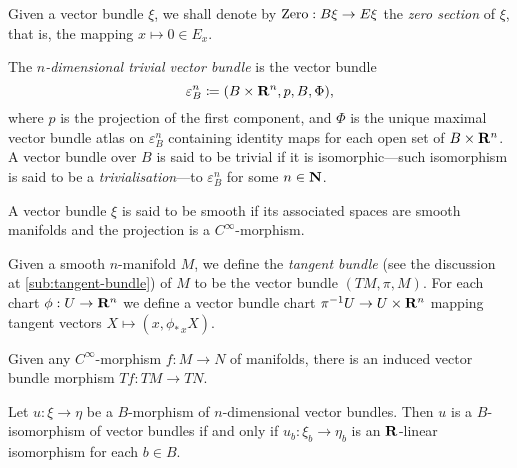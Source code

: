 \documentclass[../../../deep-dive]{subfile}
\begin{document}
\begin{definition}
\label{def:zero-section}
Given a vector bundle \(\xi\), we shall denote by \(\operatorname{Zero}: B \xi \to E \xi\)
the \emph{zero section} of \(\xi\), that is, the mapping \(x \mapsto 0 \in E_x\).
\end{definition}

\begin{definition}
\label{def:trivial-vector-bundle}
The \emph{\(n\)-dimensional trivial vector bundle} is the vector bundle
\[
\varepsilon_B^n \coloneq (B \times \mathbf{R}^n, p, B, \Phi),
\]
where \(p\) is the projection of the first component, and \(\Phi\) is the unique
maximal vector bundle atlas on \(\varepsilon_B^n\) containing identity maps for
each open set of \(B \times \mathbf{R}^n\). A vector bundle over \(B\) is said to be
trivial if it is isomorphic---such isomorphism is said to be a
\emph{trivialisation}---to \(\varepsilon_B^n\) for some \(n \in \mathbf{N}\).
\end{definition}

\begin{definition}
\label{def:smooth-bundles}
A vector bundle \(\xi\) is said to be smooth if its associated spaces are smooth
manifolds and the projection is a \(C^{\infty}\)-morphism.
\end{definition}

\begin{example}
\label{exp:tangent-bundle}
Given a smooth \(n\)-manifold \(M\), we define the \emph{tangent bundle} (see
the discussion at \cref{sub:tangent-bundle}) of \(M\) to be the vector bundle
\((T M, \pi, M)\). For each chart \(\phi: U \to \mathbf{R}^n\) we define a vector bundle
chart \(\pi^{-1} U \to U \times \mathbf{R}^n\) mapping tangent vectors
\(X \mapsto (x, \phi_{*\, x} X)\).

Given any \(C^{\infty}\)-morphism \(f: M \to N\) of manifolds, there is an
induced vector bundle morphism \(T f: T M \to T N\).
\end{example}

\begin{theorem}
\label{thm:isomorphism-of-vector-bundles}
Let \(u: \xi \to \eta\) be a \(B\)-morphism of \(n\)-dimensional vector
bundles. Then \(u\) is a \(B\)-isomorphism of vector bundles if and only if
\(u_b: \xi_b \to \eta_b\) is an \(\mathbf{R}\)-linear isomorphism for each \(b \in B\).
\end{theorem}
\end{document}
